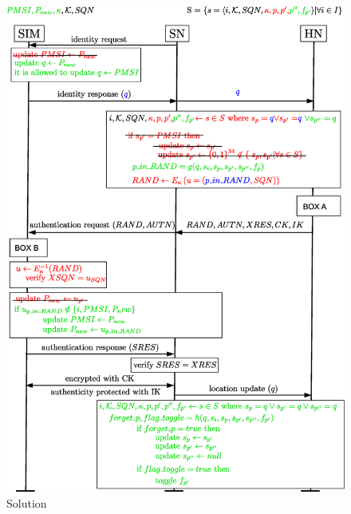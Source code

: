 \documentclass{llncs} %
\begin{document}
\begin{figure}[]
  \centering
    \includegraphics[width=\textwidth]{solution.eps}
  \caption{Solution}
  \label{fig:solution}	
\end{figure}
\end{document}
